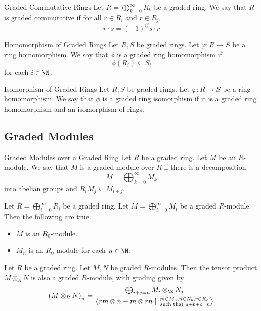 \documentclass[a4paper]{article}
\begin{document}
\begin{defn}{Graded Commutative Rings}{} Let $R=\bigoplus_{k=0}^\infty R_k$ be a graded ring. We say that $R$ is graded commutative if for all $r\in R_i$ and $r\in R_j$, $$r\cdot s=(-1)^{ij}s\cdot r$$
\end{defn}

\begin{defn}{Homomorphism of Graded Rings}{} Let $R,S$ be graded rings. Let $\varphi:R\to S$ be a ring homomorphism. We say that $\phi$ is a graded ring homomorphism if $$\phi(R_i)\subseteq S_i$$ for each $i\in\N$. 
\end{defn}

\begin{defn}{Isomorphism of Graded Rings}{} Let $R,S$ be graded rings. Let $\varphi:R\to S$ be a ring homomorphism. We say that $\phi$ is a graded ring isomorphism if it is a graded ring homomorphism and an isomorphism of rings. 
\end{defn}

\subsection{Graded Modules}
\begin{defn}{Graded Modules over a Graded Ring}{} Let $R$ be a graded ring. Let $M$ be an $R$-module. We say that $M$ is a graded module over $R$ if there is a decomposition $$M=\bigoplus_{k=0}^\infty M_k$$ into abelian groups and $R_iM_j\subseteq M_{i+j}$. 
\end{defn}

\begin{prp}{}{} Let $R=\bigoplus_{i=0}^\infty R_i$ be a graded ring. Let $M=\bigoplus_{i=0}^\infty M_i$ be a graded $R$-module. Then the following are true. 
\begin{itemize}
\item $M$ is an $R_0$-module. 
\item $M_n$ is an $R_0$-module for each $n\in\N$. 
\end{itemize}
\end{prp}

\begin{prp}{}{} Let $R$ be a graded ring. Let $M,N$ be graded $R$-modules. Then the tensor product $M\otimes_RN$ is also a graded $R$-module, with grading given by $$\left(M\otimes_RN\right)_n=\frac{\bigoplus_{i+j=n}M_i\otimes_\Z N_j}{\left\langle rm\otimes n-m\otimes rn\;|\;\substack{m\in M_a, n\in N_b, r\in R_c\\\text{ such that }a+b+c=n}\right\rangle}$$
\end{prp}
\end{document}
